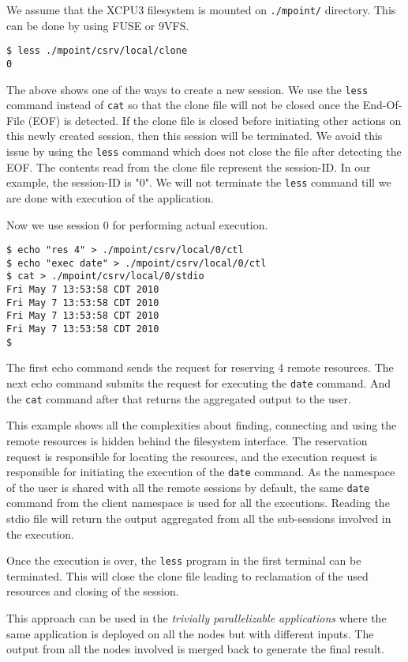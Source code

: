 We assume that the XCPU3 filesystem is mounted on \texttt{./mpoint/} directory. 
This can be done by using FUSE or 9VFS\cite{v9fseric}.
\begin{verbatim}
$ less ./mpoint/csrv/local/clone
0 
\end{verbatim}
The above shows one of the ways to create a new session.  We use the
\texttt{less} command instead of \texttt{cat} so that the clone file will not be
closed once the End-Of-File (EOF) is detected.  If the clone file is closed
before initiating other actions on this newly created  session, then this
session will be terminated.  We avoid this issue by using the \texttt{less}
command which does not close the file after detecting the EOF. The contents read
from the clone file represent the session-ID.  In our example, the session-ID
is "0".  We will not terminate the \texttt{less} command till we are done with
execution of the application.

Now we use session 0 for performing actual execution.
\begin{verbatim}
$ echo "res 4" > ./mpoint/csrv/local/0/ctl
$ echo "exec date" > ./mpoint/csrv/local/0/ctl
$ cat > ./mpoint/csrv/local/0/stdio
Fri May 7 13:53:58 CDT 2010
Fri May 7 13:53:58 CDT 2010
Fri May 7 13:53:58 CDT 2010
Fri May 7 13:53:58 CDT 2010
$
\end{verbatim}
The first echo command sends the request for reserving 4 remote resources. The
next echo command submits the request for executing the \texttt{date} command.
And the \texttt{cat} command after that returns the aggregated output to the
user.

This example shows all the complexities about finding, connecting and using
the remote resources is hidden behind the filesystem interface.  The reservation
request is responsible for locating the resources, and the execution request is
responsible for initiating the execution of the \texttt{date} command.  As the
namespace of the user is shared with all the remote sessions by default,
the same \texttt{date} command from the client namespace is used for all the
executions.  Reading the stdio file will return the output aggregated from all
the sub-sessions involved in the execution.


Once the execution is over, the \texttt{less} program in the first terminal can
be terminated.  This will close the clone file leading to reclamation of the
used resources and closing of the session.

This approach can be used in the \textit{trivially parallelizable applications}
where the same application is deployed on all the nodes but with different
inputs.  The output from all the nodes involved is merged back to generate the
final result.

